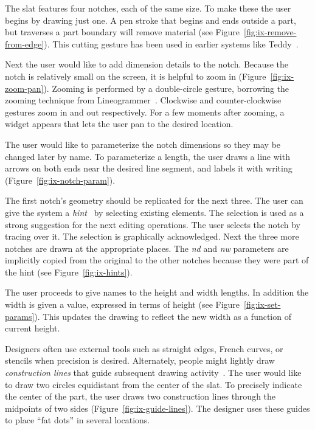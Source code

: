 \documentclass[12pt]{article}
\begin{document}
The slat features four notches, each of the same size. To make these
the user begins by drawing just one. A pen stroke that begins and ends
outside a part, but traverses a part boundary will remove material
(see Figure~\ref{fig:ix-remove-from-edge}). This cutting gesture has
been used in earlier systems like Teddy~\cite{igarashi-teddy}.

Next the user would like to add dimension details to the
notch. Because the notch is relatively small on the screen, it is
helpful to zoom in (Figure~\ref{fig:ix-zoom-pan}). Zooming is
performed by a double-circle gesture, borrowing the zooming
technique from Lineogrammer~\cite{zeleznik-lineogrammer}. Clockwise
and counter-clockwise gestures zoom in and out respectively. For a few
moments after zooming, a widget appears that lets the user pan to the
desired location.

The user would like to parameterize the notch dimensions so they may be
changed later by name. To parameterize a length, the user draws a line
with arrows on both ends near the desired line segment, and labels it
with writing (Figure~\ref{fig:ix-notch-param}).

The first notch's geometry should be replicated for the next
three. The user can give the system a
\textit{hint}~\cite{mcdaniel-gamut} by selecting existing
elements. The selection is used as a strong suggestion for the next
editing operations. The user selects the notch by tracing over it. The
selection is graphically acknowledged. Next the three more notches are
drawn at the appropriate places. The \textit{nd} and \textit{nw}
parameters are implicitly copied from the original to the other
notches because they were part of the hint (see
Figure~\ref{fig:ix-hints}).

The user proceeds to give names to the height and width lengths. In
addition the width is given a value, expressed in terms of height (see
Figure~\ref{fig:ix-set-params}). This updates the drawing to reflect
the new width as a function of current height.

Designers often use external tools such as straight edges, French
curves, or stencils when precision is desired. Alternately, people
might lightly draw \textit{construction lines} that guide subsequent
drawing activity~\cite{company-sketching-in-engineering}. The user
would like to draw two circles equidistant from the center of the
slat. To precisely indicate the center of the part, the user draws two
construction lines through the midpoints of two sides
(Figure~\ref{fig:ix-guide-lines}). The designer uses these guides
to place ``fat dots'' in several locations.
\end{document}
